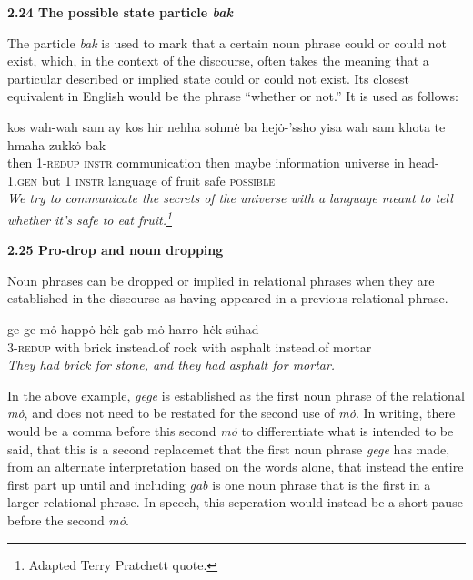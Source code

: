 \documentclass{article}[10pt]
\begin{document}
{\bf 2.24 The possible state particle \emph{bak}}

The particle \emph{bak} is used to mark that a certain noun phrase could or could not exist, which, in the context of the discourse, often takes the meaning that a particular described or implied state could or could not exist. Its closest equivalent in English would be the phrase ``whether or not.'' It is used as follows:

\begin{exe}
\ex 
\gll kos wah-wah sam ay kos hir nehha sohm\.{e} ba hej\.{o}-'ssho yisa wah sam khota te hmaha zukk\.{o} bak\\
then 1-\textsc{redup} \textsc{instr} communication then maybe information universe in head-\textsc{1.gen} but 1 \textsc{instr} language of fruit safe \textsc{possible}\\
\trans \emph{We try to communicate the secrets of the universe with a language meant to tell whether it's safe to eat fruit.\emph{\footnote{Adapted Terry Pratchett quote.}}}
\end{exe}

{\bf 2.25 Pro-drop and noun dropping}

Noun phrases can be dropped or implied in relational phrases when they are established in the discourse as having appeared in a previous relational phrase. 

\begin{exe}
\ex
\gll ge-ge m\.{o} happ\.{o} h\.{e}k gab m\.{o} harro h\.{e}k s\.{u}had\\
3-\textsc{redup} with brick instead.of rock with asphalt instead.of mortar\\
\trans \emph{They had brick for stone, and they had asphalt for mortar.}
\end{exe}

In the above example, \emph{gege} is established as the first noun phrase of the relational \emph{m\.{o}}, and does not need to be restated for the second use of \emph{m\.{o}}. In writing, there would be a comma before this second \emph{m\.{o}} to differentiate what is intended to be said, that this is a second replacemet that the first noun phrase \emph{gege} has made, from an alternate interpretation based on the words alone, that instead the entire first part up until and including \emph{gab} is one noun phrase that is the first in a larger relational phrase. In speech, this seperation would instead be a short pause before the second \emph{m\.{o}}.\\
\end{document}
